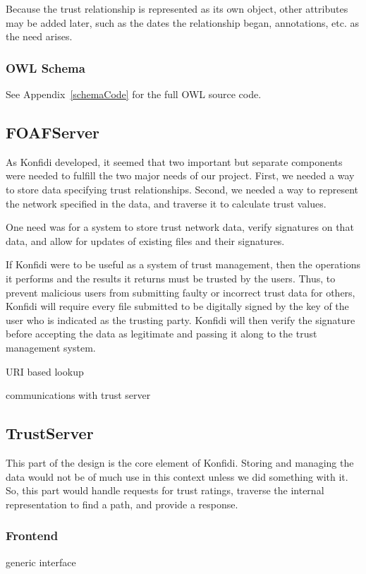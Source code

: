 \documentclass[onecolumn]{acm_proc_article-sp}
\begin{document}
Because the trust relationship is represented as its own object, other attributes may be added later, such as the dates the relationship began, annotations, etc. as the need arises.

\subsubsection{OWL Schema}
See Appendix~\ref{schemaCode} for the full OWL source code.

\subsection{FOAFServer}
As Konfidi developed, it seemed that two important but separate components were needed to fulfill the two major needs of our project.  First, we needed a way to store data specifying trust relationships.  Second, we needed a way to represent the network specified in the data, and traverse it to calculate trust values.

One need was for a system to store trust network data, verify signatures on that data, and allow for updates of existing files and their signatures.

If Konfidi were to be useful as a system of trust management, then the operations it performs and the results it returns must be trusted by the users.  Thus, to prevent malicious users from submitting faulty or incorrect trust data for others, Konfidi will require every file submitted to be digitally signed by the key of the user who is indicated as the trusting party.  Konfidi will then verify the signature before accepting the data as legitimate and passing it along to the trust management system.

URI based lookup

communications with trust server

\subsection{TrustServer}
This part of the design is the core element of Konfidi.  Storing and managing the data would not be of much use in this context unless we did something with it.  So, this part would handle requests for trust ratings, traverse the internal representation to find a path, and provide a response.  

\subsubsection{Frontend}
generic interface
\end{document}

